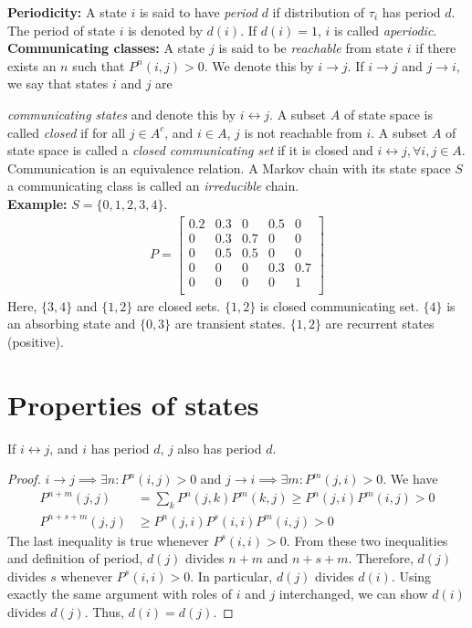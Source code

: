 \documentclass[all-lectures.tex]{subfiles}
\begin{document}
\textbf{Periodicity:} A state $i$ is said to have \textit{period} $d$ if distribution of $\tau_i$ has period $d$. The period of state $i$ is denoted by $d(i)$. If $d(i)=1$, $i$ is called \textit{aperiodic}. \\

\textbf{Communicating classes:} A state $j$ is said to be \textit{reachable} from state $i$ if there exists an $n$ such that $P^n(i,j) > 0$. We denote this by $i\rightarrow j$. If $i\rightarrow j$  and $j \rightarrow i$, we say that states $i$ and $j$ are 

\textit{communicating states} and denote this by $i \leftrightarrow j$. A subset $A$ of state space is called \textit{closed} if for all $j \in A^c$, and $i \in A$, $j$ is not reachable from $i$. A subset $A$ of state space is called a \textit{closed communicating set} if it is closed and $i \leftrightarrow j, \forall i,j \in A$. Communication is an equivalence relation. A Markov chain with its state space $S$ a communicating class is called an \textit{irreducible} chain.\\

\textbf{Example:} $S = \{0,1,2,3,4\}$.
\begin{align*}
	P = 
\begin{bmatrix}
	0.2      & 0.3 & 0 & 0.5 & 0  \\
    0      & 0.3 & 0.7 & 0 & 0 \\
	0      & 0.5 & 0.5 & 0 & 0  \\
   0      & 0 & 0 & 0.3 & 0.7  \\
    0      & 0 & 0 & 0 & 1 \\
\end{bmatrix}
\end{align*}
Here, $\{3,4\}$ and $\{1,2\}$ are closed sets. $\{1,2\}$ is closed communicating set. $\{4\}$ is an absorbing state and $\{0,3\}$ are transient states. $\{1,2\}$ are recurrent states (positive).
\section{Properties of states}
\begin{prop} \label{prop:periodicity_is_class_property}
If $i\leftrightarrow j$, and $i$ has period $d$, $j$ also has period $d$.
\begin{proof}
$i \rightarrow j \implies \exists n : P^n(i,j) > 0$ and $ j \rightarrow i \implies \exists m : P^m(j,i) > 0$. 
We have 
\begin{align*}
P^{n+m}(j,j) &= \sum_k P^n(j,k) P^m(k,j) \geq P^n(j,i) P^m(i,j) > 0 \\
P^{n+s+m}(j,j)  &\geq P^n(j,i) P^s(i,i) P^m(i,j) > 0
\end{align*}
The last inequality is true whenever $P^s(i,i) > 0$. From these two inequalities and definition of period, $d(j)$ divides $n+m$ and $n+s+m$. Therefore, $d(j)$ divides $s$ whenever $P^s(i,i) > 0$. In particular, $d(j)$ divides $d(i)$. Using exactly the same argument with roles of $i$ and $j$ interchanged, we can show $d(i)$ divides $d(j)$. Thus, $d(i) = d(j)$. \qedhere 
\end{proof}
\end{prop}
\end{document}
